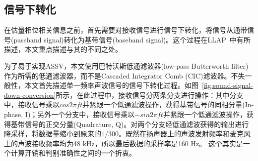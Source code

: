 \subsection{信号下转化}
在估量相位相关信息之前，首先需要对接收信号进行信号下转化，将信号从通带信号(passband signal)转化为基带信号(baseband signal)。这个过程在LLAP~\cite{wang2016device}中有所描述，本文重点描述与其的不同之处。

为了易于实现ASSV，本文使用巴特沃斯低通滤波器(low-pass Butterworth filter)作为所需的低通滤波器，而不是Cascaded Integrator Comb (CIC)滤波器。不失一般性，本文首先描述单一频率声波信号的信号下转化过程。如图~\ref{fig:sound-signal-down-conversion}所示，在此过程中，接收信号分两条分支进行操作：其中分支中，接收信号乘以$cos2\pi ft$并紧跟一个低通滤波操作，获得基带信号的同相分量(In-phase, I)；另外一个分支中，接收信号乘以$-sin2\pi ft$并紧跟一个低通滤波操作，获得基带信号的正交分量(Quadrature, Q)。对两个分支经低通滤波获得的输出进行降采样，将数据量缩小到原来的$1/300$。既然在扬声器上的声波发射频率和麦克风上的声波接收频率均为48 kHz，所以最后数据的采样率是160 Hz。 这个其实是一个计算开销和判别准确性之间的一个折衷。


